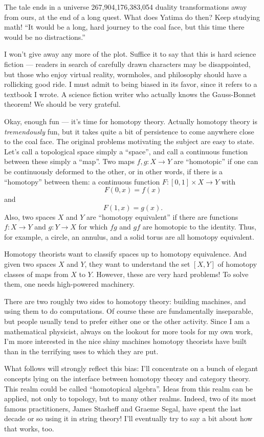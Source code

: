 \documentclass{article}
\begin{document}
The tale ends in a universe 267,904,176,383,054 duality transformations
away from ours, at the end of a long quest. What does Yatima do then?
Keep studying math! ``It would be a long, hard journey to the coal face,
but this time there would be no distractions.''

I won't give away any more of the plot. Suffice it to say that this is
hard science fiction --- readers in search of carefully drawn characters
may be disappointed, but those who enjoy virtual reality, wormholes, and
philosophy should have a rollicking good ride. I must admit to being
biased in its favor, since it refers to a textbook I wrote. A science
fiction writer who actually knows the Gauss-Bonnet theorem! We should be
very grateful.

Okay, enough fun --- it's time for homotopy theory. Actually homotopy
theory is \emph{tremendously} fun, but it takes quite a bit of
persistence to come anywhere close to the coal face. The original
problems motivating the subject are easy to state. Let's call a
topological space simply a ``space'', and call a continuous function
between these simply a ``map''. Two maps \(f,g\colon X\to Y\) are
``homotopic'' if one can be continuously deformed to the other, or in
other words, if there is a ``homotopy'' between them: a continuous
function \(F\colon[0,1]\times X\to Y\) with \[F(0,x) = f(x)\] and
\[F(1,x) = g(x).\] Also, two spaces \(X\) and \(Y\) are ``homotopy
equivalent'' if there are functions \(f\colon X\to Y\) and
\(g\colon Y\to X\) for which \(fg\) and \(gf\) are homotopic to the
identity. Thus, for example, a circle, an annulus, and a solid torus are
all homotopy equivalent.

Homotopy theorists want to classify spaces up to homotopy equivalence.
And given two spaces \(X\) and \(Y\), they want to understand the set
\([X,Y]\) of homotopy classes of maps from \(X\) to \(Y\). However,
these are very hard problems! To solve them, one needs high-powered
machinery.

There are two roughly two sides to homotopy theory: building machines,
and using them to do computations. Of course these are fundamentally
inseparable, but people usually tend to prefer either one or the other
activity. Since I am a mathematical physicist, always on the lookout for
more tools for my own work, I'm more interested in the nice shiny
machines homotopy theorists have built than in the terrifying uses to
which they are put.

What follows will strongly reflect this bias: I'll concentrate on a
bunch of elegant concepts lying on the interface between homotopy theory
and category theory. This realm could be called ``homotopical algebra''.
Ideas from this realm can be applied, not only to topology, but to many
other realms. Indeed, two of its most famous practitioners, James
Stasheff and Graeme Segal, have spent the last decade or so using it in
string theory! I'll eventually try to say a bit about how that works,
too.
\end{document}
